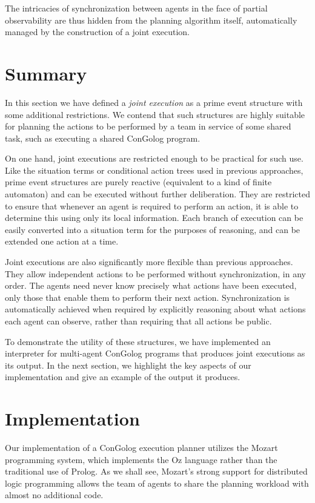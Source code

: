 The intricacies of synchronization between agents in the face of partial
observability are thus hidden from the planning algorithm itself,
automatically managed by the construction of a joint execution.


\section{Summary\label{sec:JointExec:Summary}}

In this section we have defined a \emph{joint execution} as a prime
event structure with some additional restrictions. We contend that
such structures are highly suitable for planning the actions to be
performed by a team in service of some shared task, such as executing
a shared ConGolog program.

On one hand, joint executions are restricted enough to be practical
for such use. Like the situation terms or conditional action trees
used in previous approaches, prime event structures are purely reactive
(equivalent to a kind of finite automaton) and can be executed without
further deliberation. They are restricted to ensure that whenever
an agent is required to perform an action, it is able to determine
this using only its local information. Each branch of execution can
be easily converted into a situation term for the purposes of reasoning,
and can be extended one action at a time.

Joint executions are also significantly more flexible than previous
approaches. They allow independent actions to be performed without
synchronization, in any order. The agents need never know precisely
what actions have been executed, only those that enable them to perform
their next action. Synchronization is automatically achieved when
required by explicitly reasoning about what actions each agent can
observe, rather than requiring that all actions be public.

To demonstrate the utility of these structures, we have implemented
an interpreter for multi-agent ConGolog programs that produces joint
executions as its output. In the next section, we highlight the key
aspects of our implementation and give an example of the output it
produces.


\section{Implementation\label{sec:JointExec:Implementation}}

Our implementation of a ConGolog execution planner utilizes the Mozart
programming system, which implements the Oz language \citep{vanroy99mozart}
rather than the traditional use of Prolog. As we shall see, Mozart's
strong support for distributed logic programming allows the team of
agents to share the planning workload with almost no additional code.

